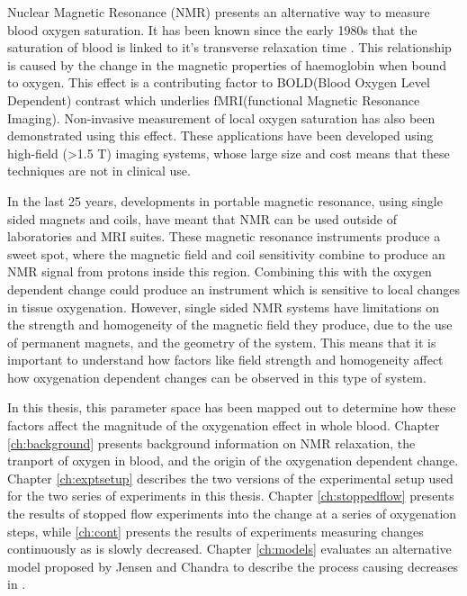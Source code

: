 Nuclear Magnetic Resonance (NMR) presents an alternative way to measure blood oxygen saturation.
It has been known since the early 1980s that the saturation of blood is linked to it's transverse relaxation time \Ttwo.
This relationship is caused by the change in the magnetic properties of haemoglobin when bound to oxygen.
This effect is a contributing factor to BOLD(Blood Oxygen Level Dependent) contrast which underlies fMRI(functional Magnetic Resonance Imaging).
Non-invasive measurement of local oxygen saturation has also been demonstrated using this effect.
These applications have been developed using high-field (>1.5 T) imaging systems, whose large size and cost means that these techniques are not in clinical use.

In the last 25 years, developments in portable magnetic resonance, using single sided magnets and coils, have meant that NMR can be used outside of laboratories and MRI suites.
These magnetic resonance instruments produce a sweet spot, where the magnetic field and coil sensitivity combine to produce an NMR signal from protons inside this region.
Combining this with the oxygen dependent \Ttwo change could produce an instrument which is sensitive to local changes in tissue oxygenation.
However, single sided NMR systems have limitations on the strength and homogeneity of the magnetic field they produce, due to the use of permanent magnets, and the geometry of the system.
This means that it is important to understand how factors like field strength and homogeneity affect how oxygenation dependent \Ttwo changes can be observed in this type of system.


In this thesis, this parameter space has been mapped out to determine how these factors affect the magnitude of the oxygenation \Ttwo effect in whole blood.
Chapter \ref{ch:background} presents background information on NMR relaxation, the tranport of oxygen in blood, and the origin of the oxygenation dependent \Ttwo change.
Chapter \ref{ch:exptsetup} describes the two versions of the experimental setup used for the two series of experiments in this thesis.
Chapter \ref{ch:stoppedflow} presents the results of stopped flow experiments into the \Ttwo change at a series of oxygenation steps, while \autoref{ch:cont} presents the results of experiments measuring \Ttwo changes continuously as \SOtwo is slowly decreased.
Chapter \ref{ch:models} evaluates an alternative model proposed by Jensen and Chandra to describe the process causing decreases in \Ttwo.
